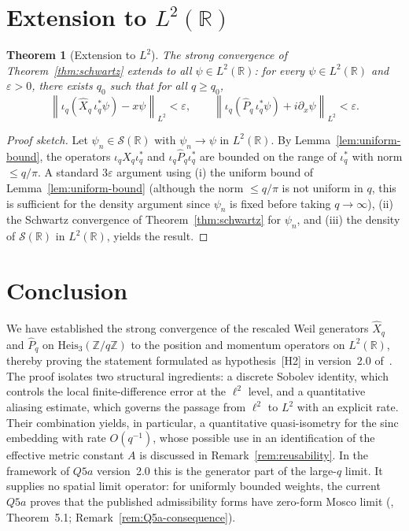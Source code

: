 \documentclass[12pt,a4paper]{article}
\newtheorem{theorem}{Theorem}[section]
\newcommand{\Heis}{\mathrm{Heis}_3}
\newcommand{\Zq}{\mathbb{Z}/q\mathbb{Z}}
\newcommand{\ltwo}{L^2(\mathbb{R})}
\newcommand{\Schwartz}{\mathcal{S}(\mathbb{R})}
\newcommand{\iotaq}{\iota_q}
\newcommand{\iotastar}{\iota_q^*}
\newcommand{\Xhat}{\hat{X}_q}
\newcommand{\Phat}{\hat{P}_q}
\newcommand{\norm}[1]{\left\|#1\right\|}
\begin{document}
    \newpage
  \section{Extension to $L^2(\mathbb{R})$}
    \label{sec:extension}

    \begin{theorem}[Extension to $L^2$]
      \label{thm:extension}
      The strong convergence of Theorem~\ref{thm:schwartz} extends to all $\psi \in \ltwo$:
      for every $\psi \in \ltwo$ and $\varepsilon > 0$, there exists $q_0$ such that
      for all $q \geq q_0$,
      \[
        \norm{\iotaq(\Xhat\,\iotastar\psi) - x\psi}_{L^2} < \varepsilon,
        \qquad
        \norm{\iotaq(\Phat\,\iotastar\psi) + i\partial_x\psi}_{L^2} < \varepsilon.
      \]
    \end{theorem}

    \begin{proof}
      [Proof sketch]
Let $\psi_n \in \Schwartz$ with $\psi_n \to \psi$ in $\ltwo$.
By Lemma~\ref{lem:uniform-bound}, the operators $\iotaq \Xhat \iotastar$ and
$\iotaq \Phat \iotastar$ are bounded on the range of $\iotastar$ with norm $\leq q/\pi$.
A standard $3\varepsilon$ argument using
(i) the uniform bound of Lemma~\ref{lem:uniform-bound} (although the norm $\leq q/\pi$
is not uniform in $q$, this is sufficient for the density argument since $\psi_n$ is fixed
before taking $q \to \infty$),
(ii) the Schwartz convergence of Theorem~\ref{thm:schwartz} for $\psi_n$, and
(iii) the density of $\Schwartz$ in $\ltwo$,
yields the result.
    \end{proof}

  \section{Conclusion}
    We have established the strong convergence of the rescaled Weil generators
    $\Xhat$ and $\Phat$ on $\Heis(\Zq)$ to the position and momentum operators
    on $\ltwo$, thereby proving the statement formulated as hypothesis~[H2] in version~2.0
    of~\cite{Beau2026q5a}.
    The proof isolates two structural ingredients: a discrete Sobolev identity,
    which controls the local finite-difference error at the $\ell^2$ level, and a
    quantitative aliasing estimate, which governs the passage from $\ell^2$ to
    $L^2$ with an explicit rate.
    Their combination yields, in particular, a quantitative quasi-isometry for the
    sinc embedding with rate $O(q^{-1})$, whose possible use in an identification of the
    effective metric constant $A$ is discussed in Remark~\ref{rem:reusability}.
    In the framework of $Q5a$ version~2.0 this is the generator part of the large-$q$ limit.
    It supplies no spatial limit operator: for uniformly bounded weights, the current $Q5a$ proves
    that the published admissibility forms have zero-form Mosco limit (\cite{Beau2026q5a},
    Theorem~5.1;
    Remark~\ref{rem:Q5a-consequence}).

    \newpage
    
    
\end{document}
